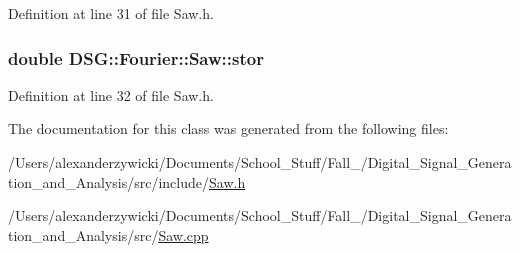 Definition at line 31 of file Saw.\-h.

\hypertarget{classDSG_1_1Fourier_1_1Saw_adb8e1058711aa912512e8ae6343c3392}{
\subsubsection[{stor}]{\setlength{\rightskip}{0pt plus 5cm}double D\-S\-G\-::\-Fourier\-::\-Saw\-::stor\hspace{0.3cm}{\ttfamily [protected]}}}\label{classDSG_1_1Fourier_1_1Saw_adb8e1058711aa912512e8ae6343c3392}


Definition at line 32 of file Saw.\-h.



The documentation for this class was generated from the following files\-:\begin{DoxyCompactItemize}
\item 
/\-Users/alexanderzywicki/\-Documents/\-School\-\_\-\-Stuff/\-Fall\-\_/\-Digital\-\_\-\-Signal\-\_\-\-Generation\-\_\-and\-\_\-\-Analysis/src/include/\hyperlink{Saw_8h}{Saw.\-h}\item 
/\-Users/alexanderzywicki/\-Documents/\-School\-\_\-\-Stuff/\-Fall\-\_/\-Digital\-\_\-\-Signal\-\_\-\-Generation\-\_\-and\-\_\-\-Analysis/src/\hyperlink{Saw_8cpp}{Saw.\-cpp}\end{DoxyCompactItemize}
